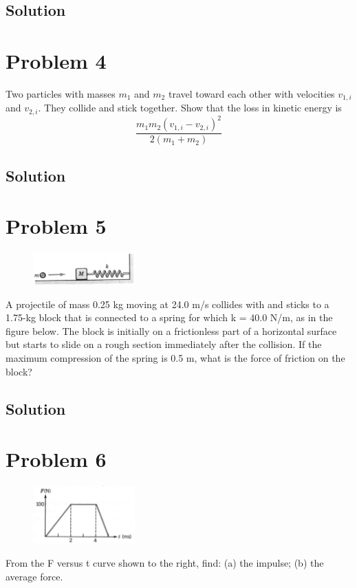 \documentclass[12pt]{article}
\begin{document}
\subsection*{Solution}


\pagebreak
\section*{Problem 4}
Two particles with masses $m_1$ and $m_2$ travel toward each other with velocities $v_{1,i}$ and $v_{2,i}$. They collide and stick together. Show that the loss in kinetic energy is
\[ \frac{m_1 m_2 \left(v_{1,i} - v_{2,i}\right)^2}{2(m_1 + m_2)} \]

\subsection*{Solution}


\pagebreak
\section*{Problem 5}
\begin{figure}
    \vspace{-30pt}
    \includegraphics[width=0.35\textwidth]{graph_5.png} 
\end{figure}
A projectile of mass 0.25 kg moving at 24.0 m/s collides with and sticks to a 1.75-kg block that is connected to a spring for which k = 40.0 N/m, as in the figure below. The block is initially on a frictionless part of a horizontal surface but starts to slide on a rough section immediately after the collision. If the maximum compression of the spring is 0.5 m, what is the force of friction on the block?

\subsection*{Solution}


\pagebreak
\section*{Problem 6}
\begin{figure}
    \vspace{-58pt}
    \includegraphics[width=0.35\textwidth]{graph_6.png} 
\end{figure}
From the F versus t curve shown to the right, find: (a) the impulse; (b) the average force.
\end{document}
